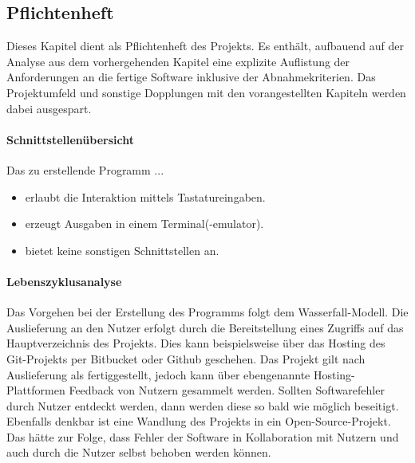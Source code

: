 \subsection{Pflichtenheft} \label{Pflichtenheft}
Dieses Kapitel dient als Pflichtenheft des Projekts. Es enthält, aufbauend auf
der Analyse aus dem vorhergehenden Kapitel eine explizite Auflistung der Anforderungen
an die fertige Software inklusive der Abnahmekriterien. Das Projektumfeld und
sonstige Dopplungen mit den vorangestellten Kapiteln werden dabei ausgespart.

\paragraph{Schnittstellenübersicht}
Das zu erstellende Programm ...
\begin{itemize}
    \item erlaubt die Interaktion mittels Tastatureingaben.
    \item erzeugt Ausgaben in einem Terminal(-emulator).
    \item bietet keine sonstigen Schnittstellen an.
\end{itemize}

\paragraph{Lebenszyklusanalyse}
Das Vorgehen bei der Erstellung des Programms folgt dem Wasserfall-Modell. Die
Auslieferung an den Nutzer erfolgt durch die Bereitstellung eines Zugriffs auf
das Hauptverzeichnis des Projekts. Dies kann beispielsweise über das Hosting des
Git-Projekts per Bitbucket oder Github geschehen. Das Projekt gilt nach
Auslieferung als fertiggestellt, jedoch kann über ebengenannte Hosting-Plattformen
Feedback von Nutzern gesammelt werden. Sollten Softwarefehler durch Nutzer
entdeckt werden, dann werden diese so bald wie möglich beseitigt. Ebenfalls
denkbar ist eine Wandlung des Projekts in ein Open-Source-Projekt. Das hätte zur
Folge, dass Fehler der Software in Kollaboration mit Nutzern und auch durch die
Nutzer selbst behoben werden können.

